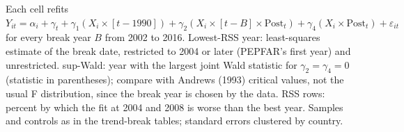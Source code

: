 \begin{table}[htbp]
{\begin{tabular}{lcccccc}
\bottomrule
\end{tabular}}
\par\vspace{4pt}
\begin{minipage}{\textwidth}\footnotesize Each cell refits $Y_{it} = \alpha_i + \gamma_t + \gamma_1 (X_i \times [t-1990]) + \gamma_2 (X_i \times [t-B] \times \mathrm{Post}_t) + \gamma_4 (X_i \times \mathrm{Post}_t) + \varepsilon_{it}$ for every break year $B$ from 2002 to 2016. Lowest-RSS year: least-squares estimate of the break date, restricted to 2004 or later (PEPFAR's first year) and unrestricted. sup-Wald: year with the largest joint Wald statistic for $\gamma_2 = \gamma_4 = 0$ (statistic in parentheses); compare with Andrews (1993) critical values, not the usual F distribution, since the break year is chosen by the data. RSS rows: percent by which the fit at 2004 and 2008 is worse than the best year. Samples and controls as in the trend-break tables; standard errors clustered by country.\end{minipage}
\end{table}
